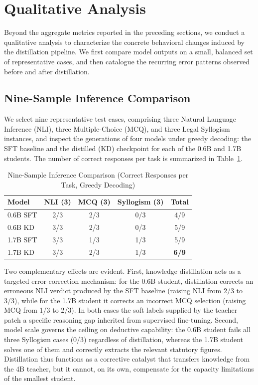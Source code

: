 \section{Qualitative Analysis}

Beyond the aggregate metrics reported in the preceding sections, we conduct a qualitative analysis to characterize the concrete behavioral changes induced by the distillation pipeline. We first compare model outputs on a small, balanced set of representative cases, and then catalogue the recurring error patterns observed before and after distillation.

\subsection{Nine-Sample Inference Comparison}

We select nine representative test cases, comprising three Natural Language Inference (NLI), three Multiple-Choice (MCQ), and three Legal Syllogism instances, and inspect the generations of four models under greedy decoding: the SFT baseline and the distilled (KD) checkpoint for each of the 0.6B and 1.7B students. The number of correct responses per task is summarized in Table~\ref{tab:nine_sample}.

\begin{table}[htbp]
\centering
\caption{Nine-Sample Inference Comparison (Correct Responses per Task, Greedy Decoding)}
\label{tab:nine_sample}
\begin{tabular}{lcccc}
\hline
\textbf{Model} & \textbf{NLI (3)} & \textbf{MCQ (3)} & \textbf{Syllogism (3)} & \textbf{Total} \\ \hline
0.6B SFT & 2/3 & 2/3 & 0/3 & 4/9 \\
0.6B KD  & 3/3 & 2/3 & 0/3 & 5/9 \\
1.7B SFT & 3/3 & 1/3 & 1/3 & 5/9 \\
1.7B KD  & 3/3 & 2/3 & 1/3 & \textbf{6/9} \\ \hline
\end{tabular}
\end{table}

Two complementary effects are evident. First, knowledge distillation acts as a targeted error-correction mechanism: for the 0.6B student, distillation corrects an erroneous NLI verdict produced by the SFT baseline (raising NLI from 2/3 to 3/3), while for the 1.7B student it corrects an incorrect MCQ selection (raising MCQ from 1/3 to 2/3). In both cases the soft labels supplied by the teacher patch a specific reasoning gap inherited from supervised fine-tuning. Second, model scale governs the ceiling on deductive capability: the 0.6B student fails all three Syllogism cases (0/3) regardless of distillation, whereas the 1.7B student solves one of them and correctly extracts the relevant statutory figures. Distillation thus functions as a corrective catalyst that transfers knowledge from the 4B teacher, but it cannot, on its own, compensate for the capacity limitations of the smallest student.

